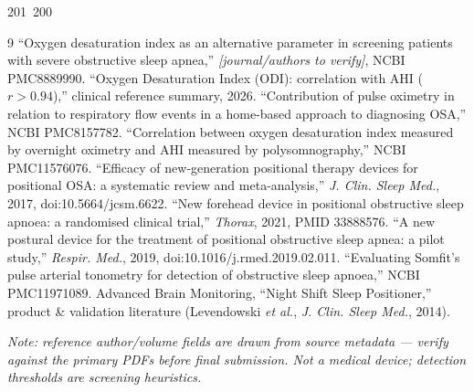201~200~\documentclass[10pt]{article}
\begin{document}
	          \begin{thebibliography}{9}
	          \footnotesize
	           ``Oxygen desaturation index as an alternative parameter in screening patients with severe obstructive sleep apnea,'' \textit{[journal/authors to verify]}, NCBI PMC8889990.
	           ``Oxygen Desaturation Index (ODI): correlation with AHI ($r>0.94$),'' clinical reference summary, 2026.
	           ``Contribution of pulse oximetry in relation to respiratory flow events in a home-based approach to diagnosing OSA,'' NCBI PMC8157782.
	           ``Correlation between oxygen desaturation index measured by overnight oximetry and AHI measured by polysomnography,'' NCBI PMC11576076.
	           ``Efficacy of new-generation positional therapy devices for positional OSA: a systematic review and meta-analysis,'' \textit{J. Clin. Sleep Med.}, 2017, doi:10.5664/jcsm.6622.
	           ``New forehead device in positional obstructive sleep apnoea: a randomised clinical trial,'' \textit{Thorax}, 2021, PMID 33888576.
	           ``A new postural device for the treatment of positional obstructive sleep apnea: a pilot study,'' \textit{Respir. Med.}, 2019, doi:10.1016/j.rmed.2019.02.011.
	           ``Evaluating Somfit's pulse arterial tonometry for detection of obstructive sleep apnoea,'' NCBI PMC11971089.
	           Advanced Brain Monitoring, ``Night Shift Sleep Positioner,'' product \& validation literature (Levendowski \textit{et al.}, \textit{J. Clin. Sleep Med.}, 2014).
	          \end{thebibliography}
	          \vspace{-2mm}
	          {\scriptsize\itshape Note: reference author/volume fields are drawn from source metadata --- verify against the primary PDFs before final submission. Not a medical device; detection thresholds are screening heuristics.}

	          
\end{document}
